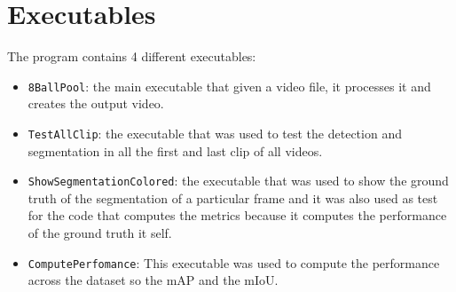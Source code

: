 \section{Executables}
The program contains 4 different executables:
\begin{itemize}
	\item \texttt{8BallPool}: the main executable that given a video file, it processes it and creates the output video.
	\item \texttt{TestAllClip}: the executable that was used to test the detection and segmentation in all the first and last clip of all videos.
	\item \texttt{ShowSegmentationColored}: the executable that was used to show the ground truth of the segmentation of a particular frame and it was also used
			as test for the code that computes the metrics because it computes the performance of the ground truth it self.
	\item \texttt{ComputePerfomance}: This executable was used to compute the performance across the dataset so the mAP and the mIoU.
\end{itemize}
